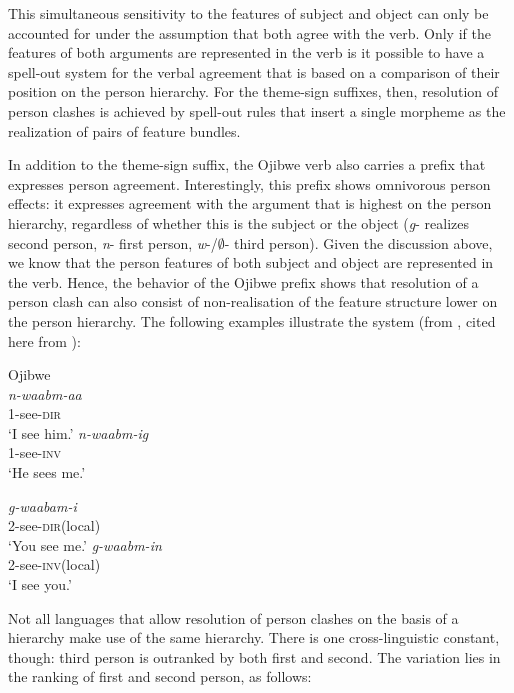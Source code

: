 \documentclass[output=paper]{langsci/langscibook}
\begin{document}
 
This simultaneous sensitivity to the features of subject and object can only be accounted for under the assumption that both agree with the verb. Only if the features of both arguments are represented in the verb is it possible to have a spell-out system for the verbal agreement that is based on a comparison of their position on the person hierarchy. For the theme-sign suffixes, then, resolution of person clashes is achieved by spell-out rules that insert a single morpheme as the realization of pairs of feature bundles.

  In addition to the theme-sign suffix, the Ojibwe verb also carries a prefix that expresses person agreement. Interestingly, this prefix shows omnivorous person effects: it expresses agreement with the argument that is highest on the person hierarchy, regardless of whether this is the subject or the object (\textit{g}{}- realizes second person, \textit{n}{}- first person, \textit{w}{}-/${\emptyset}${}- third person). Given the discussion above, we know that the person features of both subject and object are represented in the verb. Hence, the behavior of the Ojibwe prefix shows that resolution of a person clash can also consist of non-realisation of the feature structure lower on the person hierarchy. The following examples illustrate the system (from \citealt{Valentine2001}, cited here from \citealt{Lochbihler2008}):

\ea      Ojibwe\\
 \ea
 \gll  \textit{n-waabm-aa} \\
       1-see-\textsc{dir}    \\
 \glt  ‘I see him.’
\ex
  \gll     \textit{n-waabm-ig}\\
           1-see-\textsc{inv}  \\
  \glt         ‘He sees me.’
\z
 \z

\ea 
  \ea
 \gll     \textit{g-waabam-i}      \\
           2-see-\textsc{dir}(local)  \\
 \glt      ‘You see me.’
 \ex
   \gll  \textit{g-waabm-in}\\
         2-see-\textsc{inv}(local)\\
   \glt   ‘I see you.’
\z
  \z

Not all languages that allow resolution of person clashes on the basis of a hierarchy make use of the same hierarchy. There is one cross-linguistic constant, though: third person is outranked by both first and second. The variation lies in the ranking of first and second person, as follows:
\end{document}

